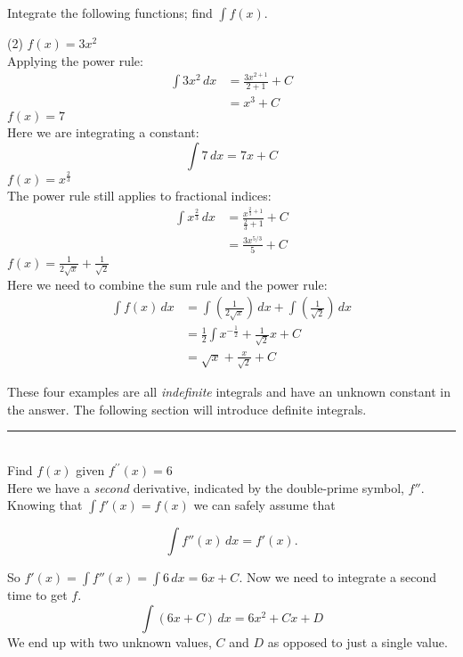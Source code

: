 \example Integrate the following functions; find $\displaystyle\int f(x)$.
\begin{tasks}(2)
	\task $f(x) =3x^{2}$ \medskip\\
	\solution Applying the power rule:\\
\begin{align*}\int 3x^{2}\,dx&=\frac{3x^{2+1}}{2+1}+C\\
	&=x^3+C\end{align*}
\task $f (x) =7$ \medskip \\
\solution Here we are integrating a constant:\\
\[\int 7\,dx=7x+C\]
\task $f(x) =x^{\frac{2}{3}}$ \medskip\\
\solution The power rule still applies to fractional indices:\\
\begin{align*}\int x^{\frac{2}{3}}\,dx&=\frac{x^{\frac{2}{3}+1}}{\frac{2}{3}+1}+C\\
&=\frac{3 x^{5/3}}{5}+C \end{align*}
\task $f (x) =\frac{1}{2 \sqrt{x}} +\frac{1}{\sqrt{2}}$ \medskip\\
\solution Here we need to combine the sum rule and the power rule:\\
\begin{align*}
\int f(x)\,dx &= \int(\frac{1}{2 \sqrt{x}}) \,dx+\int(\frac{1}{\sqrt{2}}) \,dx\\
&=\frac{1}{2}\int x^{-\frac{1}{2}}+\frac{1}{\sqrt{2}}x+C\\
&=\sqrt{x}+\frac{x}{\sqrt{2}}+C
\end{align*}
\end{tasks}
These four examples are all \textit{indefinite} integrals and have an unknown constant in the answer. The following section will introduce definite integrals.\vspace{1cm}\\
\rule{6.8cm}{0.5pt}\\
\example Find $f (x)$ given $f^{ \prime  \prime } (x) =6$\medskip\\
\solution Here we have a \textit{second} derivative, indicated by the double-prime symbol, $f''$. Knowing that $\int f'(x)=f(x)$ we can safely assume that 
\begin{tcolorbox}
	\[\int f''(x) \,dx = f'(x).\]
\end{tcolorbox}
So $f'(x)=\int f''(x) = \int 6 \,dx = 6x+C$. Now we need to integrate a second time to get $f$.
\[\int (6x+C)\,dx=6x^2+Cx+D\]
We end up with two unknown values, $C$ and $D$ as opposed to just a single value.

